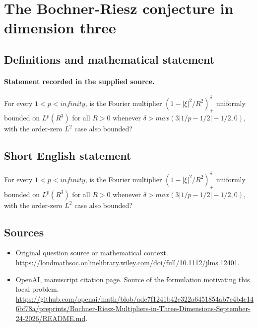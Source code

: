 \documentclass[11pt]{article}
\begin{document}
\section*{The Bochner-Riesz conjecture in dimension three}\label{30007422}
\subsection{Definitions and mathematical statement}
\paragraph{Statement recorded in the supplied source.}
For every $1<p<infinity$, is the Fourier multiplier $(1-|\xi |^2/R^2)_+^\delta $ uniformly bounded on $L^p(R^3)$ for all $R>0$ whenever $\delta >max(3|1/p-1/2|-1/2,0)$, with the order-zero $L^2$ case also bounded?
\subsection{Short English statement}
For every $1<p<infinity$, is the Fourier multiplier $(1-|\xi |^2/R^2)_+^\delta $ uniformly bounded on $L^p(R^3)$ for all $R>0$ whenever $\delta >max(3|1/p-1/2|-1/2,0)$, with the order-zero $L^2$ case also bounded?
\subsection{Sources}
\begin{itemize}
\item[S1] Original question source or mathematical context.
\url{https://londmathsoc.onlinelibrary.wiley.com/doi/full/10.1112/jlms.12401}.
\item[S2] OpenAI, manuscript citation page. Source of the formulation motivating this local problem.
\url{https://github.com/openai/math/blob/adc7f1241b42e322a6451854ab7e4b4c146bf78a/preprints/Bochner-Riesz-Multipliers-in-Three-Dimensions-September-24-2026/README.md}.
\end{itemize}
\end{document}
